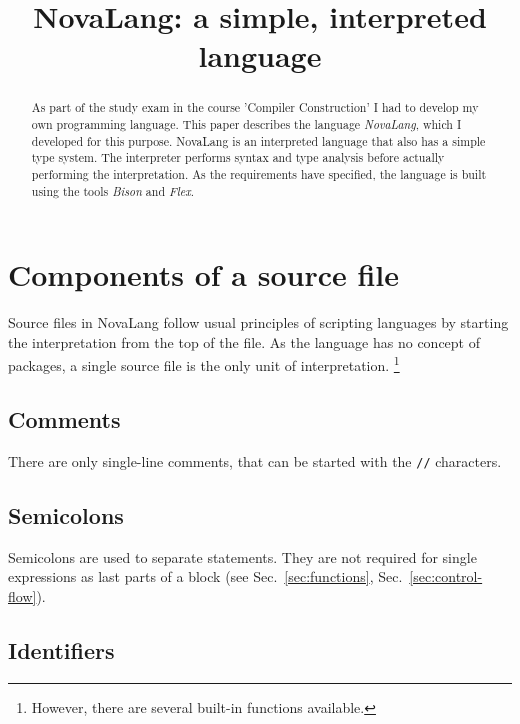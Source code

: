 \documentclass[conference]{IEEEtran}
\begin{document}
\title{NovaLang: a simple, interpreted language}

\author{}

\maketitle

\begin{abstract}
    As part of the study exam in the course 'Compiler Construction' I had to develop my own programming language.
    This paper describes the language \emph{NovaLang}, which I developed for this purpose.
    NovaLang is an interpreted language that also has a simple type system.
    The interpreter performs syntax and type analysis before actually performing the interpretation.
    As the requirements have specified, the language is built using the tools \emph{Bison} and \emph{Flex}.
\end{abstract}

\section{Components of a source file}

Source files in NovaLang follow usual principles of scripting languages by starting the interpretation from the top of the file.
As the language has no concept of packages, a single source file is the only unit of interpretation. \footnote{However, there are several built-in functions available.}

\subsection{Comments}

There are only single-line comments, that can be started with the \texttt{//} characters.

\subsection{Semicolons}

Semicolons are used to separate statements.
They are not required for single expressions as last parts of a block (see Sec.~\ref{sec:functions}, Sec.~\ref{sec:control-flow}).

\subsection{Identifiers}
\end{document}
